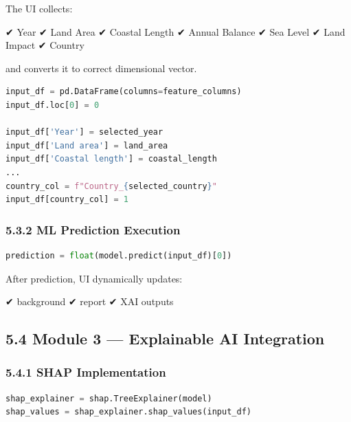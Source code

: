 \documentclass[12pt, a4paper]{article}
\begin{document}
The UI collects:

✔ Year  
✔ Land Area  
✔ Coastal Length  
✔ Annual Balance  
✔ Sea Level  
✔ Land Impact  
✔ Country  

and converts it to correct dimensional vector.

\begin{lstlisting}[language=Python]
input_df = pd.DataFrame(columns=feature_columns)
input_df.loc[0] = 0

input_df['Year'] = selected_year
input_df['Land area'] = land_area
input_df['Coastal length'] = coastal_length
...
country_col = f"Country_{selected_country}"
input_df[country_col] = 1
\end{lstlisting}



\subsubsection{\textbf{5.3.2 ML Prediction Execution}}

\begin{lstlisting}[language=Python]
prediction = float(model.predict(input_df)[0])
\end{lstlisting}

After prediction, UI dynamically updates:

✔ background  
✔ report  
✔ XAI outputs  



\subsection{\textbf{5.4 Module 3 — Explainable AI Integration}}


\subsubsection{\textbf{5.4.1 SHAP Implementation}}

\begin{lstlisting}[language=Python]
shap_explainer = shap.TreeExplainer(model)
shap_values = shap_explainer.shap_values(input_df)
\end{lstlisting}
\end{document}
